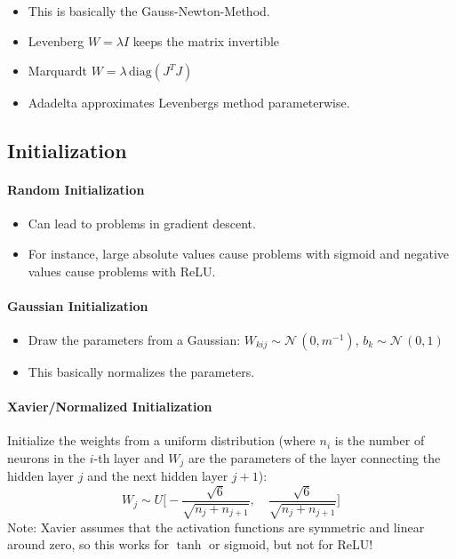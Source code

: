 \documentclass[a4paper, 11pt, accentcolor = tud3b]{tudreport}
\begin{document}
					\begin{itemize}
						\item This is basically the Gauss-Newton-Method.
						\item Levenberg \( W = \lambda I \) keeps the matrix invertible
						\item Marquardt \( W = \lambda \, \textrm{diag}(J^T J) \)
						\item Adadelta approximates Levenbergs method parameterwise.
					\end{itemize}

			\subsection{Initialization}
				\paragraph{Random Initialization}
					\begin{itemize}
						\item Can lead to problems in gradient descent.
						\item For instance, large absolute values cause problems with sigmoid and negative values cause problems with ReLU.
					\end{itemize}

				\paragraph{Gaussian Initialization}
					\begin{itemize}
						\item Draw the parameters from a Gaussian: \( W_{kij} \sim \mathcal{N}\,(0, m^{-1}) \), \( b_k \sim \mathcal{N}\,(0, 1) \)
						\item This basically normalizes the parameters.
					\end{itemize}

				\paragraph{Xavier/Normalized Initialization}
					Initialize the weights from a uniform distribution (where \(n_i\) is the number of neurons in the \(i\)-th layer and \(W_j\) are the parameters of the layer connecting the hidden layer \(j\) and the next hidden layer \(j + 1\)):
					\begin{equation}
						W_j \sim U\Bigg[ -\frac{\sqrt{6}}{\sqrt{n_j + n_{j + 1}}}, \quad \frac{\sqrt{6}}{\sqrt{n_j + n_{j + 1}}} \Bigg]
					\end{equation}
					Note: Xavier assumes that the activation functions are symmetric and linear around zero, so this works for \(\tanh\) or sigmoid, but not for ReLU!
\end{document}
